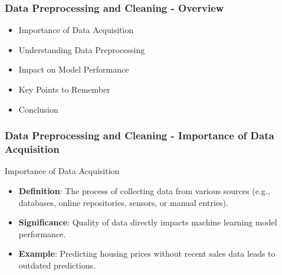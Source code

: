 \documentclass[aspectratio=169]{beamer}
\begin{document}
\begin{frame}[fragile]
    \frametitle{Data Preprocessing and Cleaning - Overview}
    \begin{itemize}
        \item Importance of Data Acquisition
        \item Understanding Data Preprocessing
        \item Impact on Model Performance
        \item Key Points to Remember
        \item Conclusion
    \end{itemize}
\end{frame}

\begin{frame}[fragile]
    \frametitle{Data Preprocessing and Cleaning - Importance of Data Acquisition}
    \begin{block}{Importance of Data Acquisition}
        \begin{itemize}
            \item \textbf{Definition}: The process of collecting data from various sources (e.g., databases, online repositories, sensors, or manual entries).
            \item \textbf{Significance}: Quality of data directly impacts machine learning model performance.
            \item \textbf{Example}: Predicting housing prices without recent sales data leads to outdated predictions.
        \end{itemize}
    \end{block}
\end{frame}
\end{document}
